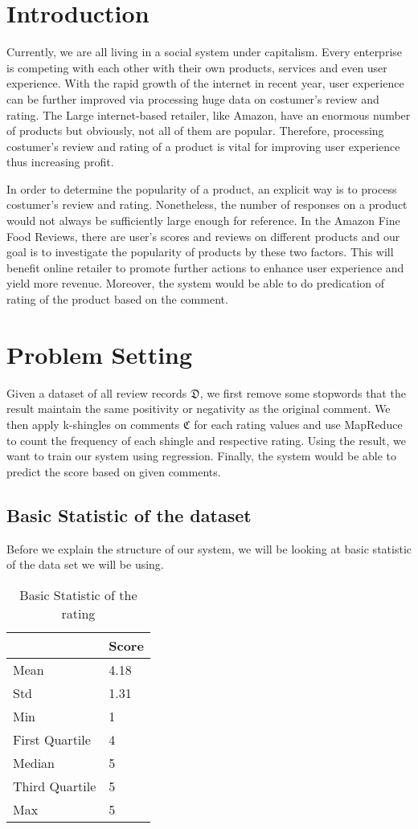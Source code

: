 \section{Introduction}
Currently, we are all living in a social system under capitalism. Every enterprise is competing with each other with their own products, services and even user experience. With the rapid growth of the internet in recent year, user experience can be further improved via processing huge data on costumer's review and rating. The Large internet-based retailer, like Amazon, have an enormous number of products but obviously, not all of them are popular. Therefore, processing costumer's review and rating of a product is vital for improving user experience thus increasing profit.

In order to determine the popularity of a product, an explicit way is to process costumer's review and rating. Nonetheless, the number of responses on a product would not always be sufficiently large enough for reference. In the Amazon Fine Food Reviews, there are user's scores and reviews on different products and our goal is to investigate the popularity of products by these two factors. This will benefit online retailer to promote further actions to enhance user experience and yield more revenue. Moreover, the system would be able to do predication of rating of the product based on the comment.


\section{Problem Setting}
Given a dataset of all review records \(\mathfrak{D}\), we first remove some stopwords that the result maintain the same positivity or negativity as the original comment. We then apply k-shingles on comments \(\mathfrak{C}\) for each rating values and use MapReduce to count the frequency of each shingle and respective rating. Using the result, we want to train our system using regression. Finally, the system would be able to predict the score based on given comments.

\subsection{Basic Statistic of the dataset}
Before we explain the structure of our system, we will be looking at basic statistic of the data set we will be using. 
\begin{table}[H]
  \caption{Basic Statistic of the rating}
  \label{tab:commands}
  \begin{tabular}{ll}
  	\toprule
    & Score \\ 
    \midrule
    Mean & 4.18 \\
    Std & 1.31 \\ 
    Min & 1 \\
    First Quartile & 4 \\
    Median & 5 \\
    Third Quartile & 5 \\
    Max & 5 \\ 
    \bottomrule
  \end{tabular}
\end{table}

